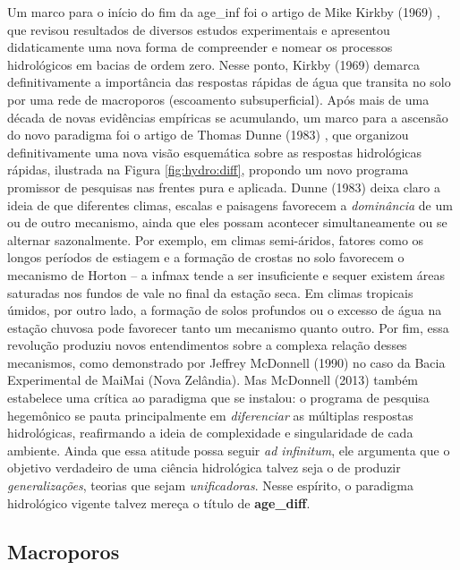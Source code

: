 \documentclass[./main.tex]{subfiles}
\begin{document}
\par Um marco para o início do fim da \gls{age_inf} foi o artigo de Mike Kirkby (1969) \cite{Kirkby1969}, que revisou resultados de diversos estudos experimentais e apresentou didaticamente uma nova forma de compreender e nomear os processos hidrológicos em bacias de ordem zero. Nesse ponto, Kirkby (1969) demarca definitivamente a importância das respostas rápidas de água que transita no solo por uma rede de macroporos (escoamento subsuperficial). Após mais de uma década de novas evidências empíricas se acumulando, um marco para a ascensão do novo \gls{paradigma} foi o artigo de Thomas Dunne (1983) \cite{Dunne1983}, que organizou definitivamente uma nova visão esquemática sobre as respostas hidrológicas rápidas, ilustrada na Figura \ref{fig:hydro:diff}, propondo um novo programa promissor de pesquisas nas frentes pura e aplicada. Dunne (1983) deixa claro a ideia de que diferentes climas, escalas e paisagens favorecem a \textit{dominância} de um ou de outro mecanismo, ainda que eles possam acontecer simultaneamente ou se alternar sazonalmente. Por exemplo, em climas semi-áridos, fatores como os longos períodos de estiagem e a formação de crostas no solo favorecem o mecanismo de Horton -- a \gls{infmax} tende a ser insuficiente e sequer existem áreas saturadas nos fundos de vale no final da estação seca. Em climas tropicais úmidos, por outro lado, a formação de solos profundos ou o excesso de água na estação chuvosa pode favorecer tanto um mecanismo quanto outro. Por fim, essa revolução produziu novos entendimentos sobre a complexa relação desses mecanismos, como demonstrado por Jeffrey McDonnell (1990) \cite{mcdonnell1990} no caso da Bacia Experimental de MaiMai (Nova Zelândia). Mas McDonnell (2013) \cite{Mcdonnell2013} também estabelece uma crítica ao \gls{paradigma} que se instalou: o programa de pesquisa hegemônico se pauta principalmente em \textit{diferenciar} as múltiplas respostas hidrológicas, reafirmando a ideia de complexidade e singularidade de cada ambiente. Ainda que essa atitude possa seguir \textit{ad infinitum}, ele argumenta que o objetivo verdadeiro de uma ciência hidrológica talvez seja o de produzir \textit{generalizações}, teorias que sejam \textit{unificadoras}. Nesse espírito, o \gls{paradigma} hidrológico vigente talvez mereça o título de \textbf{\gls{age_diff}}.

\subsection{Macroporos}
\end{document}
